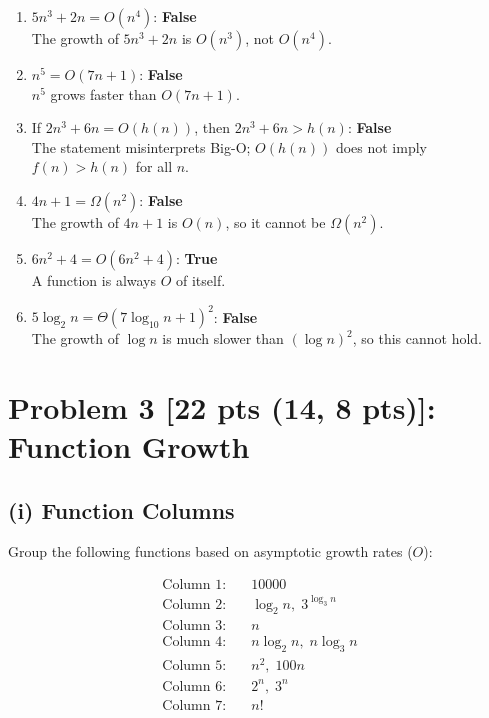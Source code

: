 \documentclass[10pt]{article}
\begin{document}
\begin{enumerate}
    \item \( 5n^3 + 2n = O(n^4) \): \textbf{False} \\
    The growth of \( 5n^3 + 2n \) is \( O(n^3) \), not \( O(n^4) \).

    \item \( n^5 = O(7n + 1) \): \textbf{False} \\
    \( n^5 \) grows faster than \( O(7n + 1) \).

    \item If \( 2n^3 + 6n = O(h(n)) \), then \( 2n^3 + 6n > h(n) \): \textbf{False} \\
    The statement misinterprets Big-O; \( O(h(n)) \) does not imply \( f(n) > h(n) \) for all \( n \).

    \item \( 4n + 1 = \Omega(n^2) \): \textbf{False} \\
    The growth of \( 4n + 1 \) is \( O(n) \), so it cannot be \( \Omega(n^2) \).

    \item \( 6n^2 + 4 = O(6n^2 + 4) \): \textbf{True} \\
    A function is always \( O \) of itself.

    \item \( 5 \log_2 n = \Theta(7 \log_{10} n + 1)^2 \): \textbf{False} \\
    The growth of \( \log n \) is much slower than \( (\log n)^2 \), so this cannot hold.
\end{enumerate}


\newpage

\section*{Problem 3 [22 pts (14, 8 pts)]: Function Growth}

\subsection*{(i) Function Columns}
Group the following functions based on asymptotic growth rates (\( O \)):

\begin{align*}
\text{Column 1:} & \quad 10000 \\
\text{Column 2:} & \quad \log_2 n, \; 3^{\log_3 n} \\
\text{Column 3:} & \quad n \\
\text{Column 4:} & \quad n \log_2 n, \; n \log_3 n \\
\text{Column 5:} & \quad n^2, \; 100n \\
\text{Column 6:} & \quad 2^n, \; 3^n \\
\text{Column 7:} & \quad n! \\
\end{align*}
\end{document}
